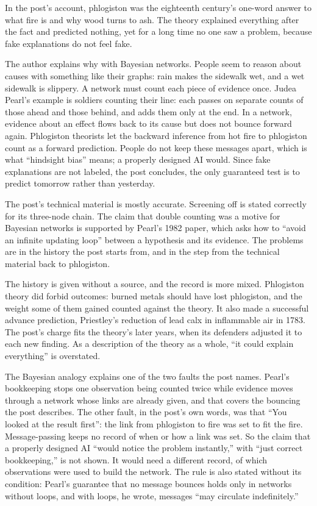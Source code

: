 \begin{afterword}
\summaryhead

In the post's account, phlogiston was the eighteenth century's one-word answer to what fire is and why wood turns to ash. The theory explained everything after the fact and predicted nothing, yet for a long time no one saw a problem, because fake explanations do not feel fake.

The author explains why with Bayesian networks. People seem to reason about causes with something like their graphs: rain makes the sidewalk wet, and a wet sidewalk is slippery. A network must count each piece of evidence once. Judea Pearl's example is soldiers counting their line: each passes on separate counts of those ahead and those behind, and adds them only at the end. In a network, evidence about an effect flows back to its cause but does not bounce forward again. Phlogiston theorists let the backward inference from hot fire to phlogiston count as a forward prediction. People do not keep these messages apart, which is what ``hindsight bias'' means; a properly designed AI would. Since fake explanations are not labeled, the post concludes, the only guaranteed test is to predict tomorrow rather than yesterday.

\responsehead

The post's technical material is mostly accurate. Screening off is stated correctly for its three-node chain. The claim that double counting was a motive for Bayesian networks is supported by Pearl's 1982 paper, which asks how to ``avoid an infinite updating loop'' between a hypothesis and its evidence. The problems are in the history the post starts from, and in the step from the technical material back to phlogiston.

The history is given without a source, and the record is more mixed. Phlogiston theory did forbid outcomes: burned metals should have lost phlogiston, and the weight some of them gained counted against the theory. It also made a successful advance prediction, Priestley's reduction of lead calx in inflammable air in 1783. The post's charge fits the theory's later years, when its defenders adjusted it to each new finding. As a description of the theory as a whole, ``it could explain everything'' is overstated.

The Bayesian analogy explains one of the two faults the post names. Pearl's bookkeeping stops one observation being counted twice while evidence moves through a network whose links are already given, and that covers the bouncing the post describes. The other fault, in the post's own words, was that ``You looked at the result first'': the link from phlogiston to fire was set to fit the fire. Message-passing keeps no record of when or how a link was set. So the claim that a properly designed AI ``would notice the problem instantly,'' with ``just correct bookkeeping,'' is not shown. It would need a different record, of which observations were used to build the network. The rule is also stated without its condition: Pearl's guarantee that no message bounces holds only in networks without loops, and with loops, he wrote, messages ``may circulate indefinitely.''


\end{afterword}
